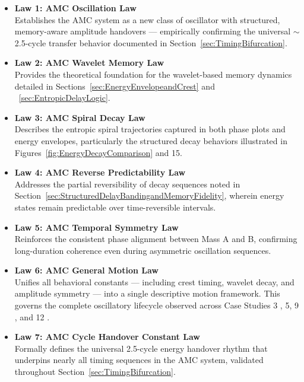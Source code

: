 \documentclass[10pt,aps,pre,onecolumn,superscriptaddress,notitlepage]{revtex4-2}
\begin{document}
\begin{itemize}[leftmargin=1.5em]

\item \textbf{Law 1: AMC Oscillation Law \cite{karim2025oscillation}} \\
Establishes the AMC system as a new class of oscillator with structured, memory-aware amplitude handovers — empirically confirming the universal $\sim$2.5-cycle transfer behavior documented in Section~\ref{sec:TimingBifurcation}.

\item \textbf{Law 2: AMC Wavelet Memory Law \cite{karim2025waveletmemory}} \\
Provides the theoretical foundation for the wavelet-based memory dynamics detailed in Sections~\ref{sec:EnergyEnvelopeandCrest} and ~\ref{sec:EntropicDelayLogic}.

\item \textbf{Law 3: AMC Spiral Decay Law \cite{karim2025spiraldecay}} \\
Describes the entropic spiral trajectories captured in both phase plots and energy envelopes, particularly the structured decay behaviors illustrated in Figures~\ref{fig:EnergyDecayComparison} and 15.

\item \textbf{Law 4: AMC Reverse Predictability Law \cite{karim2025reversepredictability}} \\
Addresses the partial reversibility of decay sequences noted in Section~\ref{sec:StructuredDelayBandingandMemoryFidelity}, wherein energy states remain predictable over time-reversible intervals.

\item \textbf{Law 5: AMC Temporal Symmetry Law \cite{karim2025temporalsymmetry}} \\
Reinforces the consistent phase alignment between Mass A and B, confirming long-duration coherence even during asymmetric oscillation sequences.

\item \textbf{Law 6: AMC General Motion Law \cite{karim2025generalmotion}} \\
Unifies all behavioral constants — including crest timing, wavelet decay, and amplitude symmetry — into a single descriptive motion framework. This governs the complete oscillatory lifecycle observed across Case Studies 3 \cite{karim2025cs3}, 5, 9 \cite{karim2025cs9}, and 12 \cite{karim2025cs12}.

\item \textbf{Law 7: AMC Cycle Handover Constant Law \cite{karim2025cyclehandover}} \\
Formally defines the universal 2.5-cycle energy handover rhythm that underpins nearly all timing sequences in the AMC system, validated throughout Section~\ref{sec:TimingBifurcation}.


\end{itemize}
\end{document}
